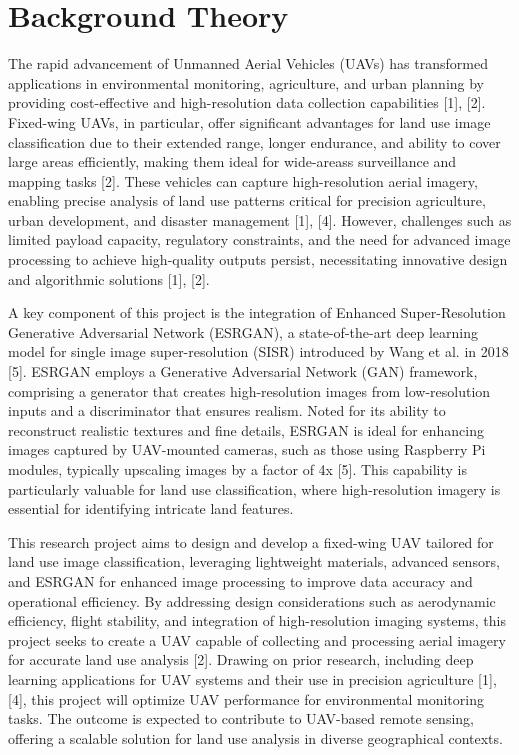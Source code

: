 \section{Background Theory}
The rapid advancement of Unmanned Aerial Vehicles (UAVs) has transformed applications in environmental monitoring, agriculture, and urban planning by providing cost-effective and high-resolution data collection capabilities [1], [2]. Fixed-wing UAVs, in particular, offer significant advantages for land use image classification due to their extended range, longer endurance, and ability to cover large areas efficiently, making them ideal for wide-areass surveillance and mapping tasks [2]. These vehicles can capture high-resolution aerial imagery, enabling precise analysis of land use patterns critical for precision agriculture, urban development, and disaster management [1], [4]. However, challenges such as limited payload capacity, regulatory constraints, and the need for advanced image processing to achieve high-quality outputs persist, necessitating innovative design and algorithmic solutions [1], [2].

A key component of this project is the integration of Enhanced Super-Resolution Generative Adversarial Network (ESRGAN), a state-of-the-art deep learning model for single image super-resolution (SISR) introduced by Wang et al. in 2018 [5]. ESRGAN employs a Generative Adversarial Network (GAN) framework, comprising a generator that creates high-resolution images from low-resolution inputs and a discriminator that ensures realism. Noted for its ability to reconstruct realistic textures and fine details, ESRGAN is ideal for enhancing images captured by UAV-mounted cameras, such as those using Raspberry Pi modules, typically upscaling images by a factor of 4x [5]. This capability is particularly valuable for land use classification, where high-resolution imagery is essential for identifying intricate land features.

This research project aims to design and develop a fixed-wing UAV tailored for land use image classification, leveraging lightweight materials, advanced sensors, and ESRGAN for enhanced image processing to improve data accuracy and operational efficiency. By addressing design considerations such as aerodynamic efficiency, flight stability, and integration of high-resolution imaging systems, this project seeks to create a UAV capable of collecting and processing aerial imagery for accurate land use analysis [2]. Drawing on prior research, including deep learning applications for UAV systems and their use in precision agriculture [1], [4], this project will optimize UAV performance for environmental monitoring tasks. The outcome is expected to contribute to UAV-based remote sensing, offering a scalable solution for land use analysis in diverse geographical contexts.

